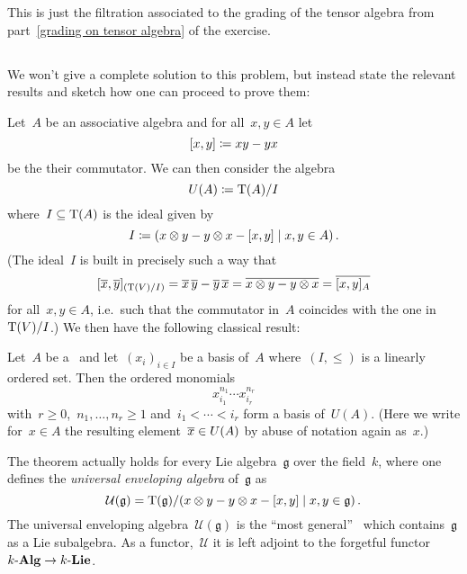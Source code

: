 This is just the filtration associated to the grading of the tensor algebra from part~\ref{grading on tensor algebra} of the exercise.





\subsection{}

We won’t give a complete solution to this problem, but instead state the relevant results and sketch how one can proceed to prove them:

Let~$A$ be an associative algebra and for all~$x, y \in A$ let
\[
            [x,y]
  \coloneqq  xy - yx
\]
be the their commutator.
We can then consider the algebra
\[
            U(A)
  \coloneqq  \operatorname{T}(A)/I
\]
where~$I \subseteq \operatorname{T}(A)$ is the {\twosided} ideal given by
\[
            I
  \defined  \genideal{
              x \tensor y - y \tensor x - [x,y]
              \suchthat
              x, y \in A
            } \,.
\]
(The ideal~$I$ is built in precisely such a way that
\[
    [\overline{x}, \overline{y}]_{(\operatorname{T}(V)/I)}
  = \overline{x} \, \overline{y} - \overline{y} \, \overline{x}
  = \overline{x \otimes y - y \otimes x}
  = \overline{[x,y]_A}
\]
for all~$x, y \in A$, i.e.\ such that the commutator in~$A$ coincides with the one in~$\operatorname{T}(V)/I$.)
We then have the following classical result:

\begin{theorem}[{\pbw}]
  Let~$A$ be a~{\kalg} and let~$(x_i)_{i \in I}$ be a basis of~$A$ where~$(I, \leq)$ is a linearly ordered set.
  Then the ordered monomials
  \[
    x_{i_1}^{n_1} \dotsm x_{i_r}^{n_r}
  \]
  with~$r \geq 0$,~$n_1, \dotsc, n_r \geq 1$ and~$i_1 < \dotsb < i_r$ form a basis of~$U(A)$.
  (Here we write for~$x \in A$ the resulting element~$\overline{x} \in U(A)$ by abuse of notation again as~$x$.)
\end{theorem}

\begin{remark}
  The {\pbw} theorem actually holds for every Lie algebra~$\mathfrak{g}$ over the field~$k$, where one defines the \emph{universal enveloping algebra} of~$\mathfrak{g}$ as
  \[
      \mathcal{U}(\mathfrak{g})
    = \Tensor(\mathfrak{g})
      /
      \genideal{
        x \tensor y - y \tensor x - [x,y]
      \suchthat
        x, y \in \mathfrak{g}
      } \,.
  \]
  The universal enveloping algebra~$\mathcal{U}(\mathfrak{g})$ is the \enquote{most general}~{\kalg} which contains~$\mathfrak{g}$ as a Lie subalgebra.
  As a functor,~$\mathcal{U}$ it is left adjoint to the forgetful functor~$\text{$k$-$\mathbf{Alg}$} \to \text{$k$-$\mathbf{Lie}$}$.
\end{remark}

